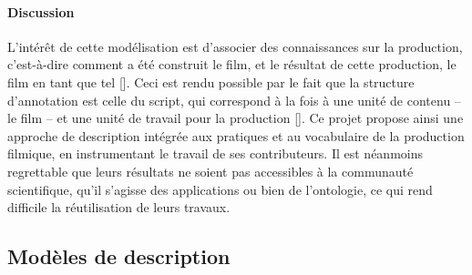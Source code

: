 \paragraph{Discussion}
L'intérêt de cette modélisation est d'associer des connaissances sur la production, c'est-à-dire comment a été construit le film, et le résultat de cette production, le film en tant que tel [].
Ceci est rendu possible par le fait que la structure d'annotation est celle du script, qui correspond à la fois à une unité de contenu -- le film -- et une unité de travail pour la production [].
Ce projet propose ainsi une approche de description intégrée aux pratiques et au vocabulaire de la production filmique, en instrumentant le travail de ses contributeurs.
Il est néanmoins regrettable que leurs résultats ne soient pas accessibles à la communauté scientifique, qu'il s'agisse des applications ou bien de l'ontologie, ce qui rend difficile la réutilisation de leurs travaux. 






\subsection{Modèles de description }\label{sec:post}



